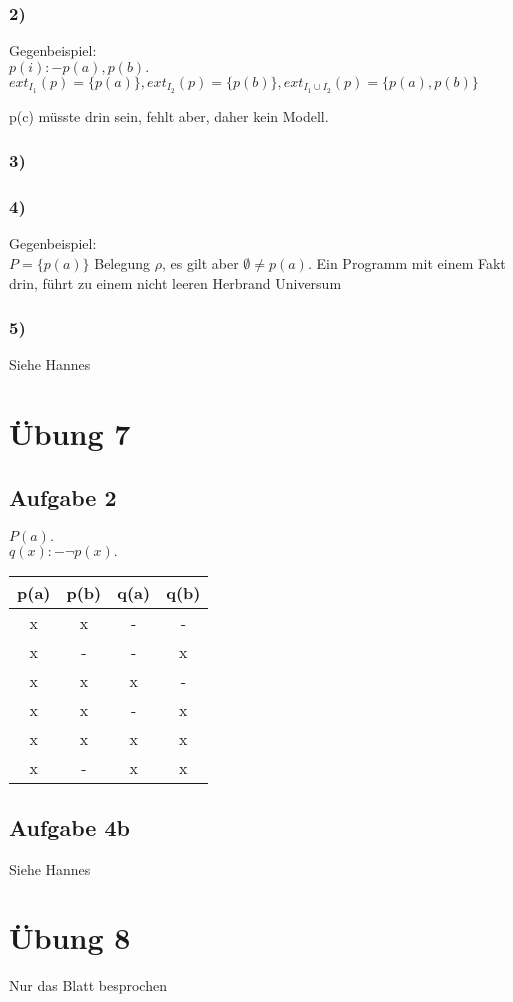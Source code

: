 \documentclass[12pt, a4paper]{article}
\begin{document}
\subsubsection*{2)}
Gegenbeispiel: \\
$p(i) :- p(a), p(b).$ \\
$ext_{I_1}(p) = \{ p(a)\}, ext_{I_2}(p) = \{ p(b) \}, ext_{I_1 \cup I_2}(p) = \{ p(a), p(b) \}$

p(c) müsste drin sein, fehlt aber, daher kein Modell.

\subsubsection*{3)}
\checkmark

\subsubsection*{4)}
Gegenbeispiel: \\
$P = \{ p(a) \}$ Belegung $\rho$, es gilt aber $\emptyset \neq p(a)$.
Ein Programm mit einem Fakt drin, führt zu einem nicht leeren Herbrand Universum

\subsubsection*{5)}
Siehe Hannes


\section*{Übung 7}

\subsection*{Aufgabe 2}
$P(a).$ \\
$q(x) :- \lnot p(x).$ \\
\begin{tabular}{|c|c|c|c|}
\hline
p(a) & p(b) & q(a) & q(b) \\ \hline
x & x & - & -\\
x & - & - & x\\
x & x & x & -\\
x & x & - & x\\
x & x & x & x\\
x & - & x & x\\
\hline
\end{tabular}

\subsection*{Aufgabe 4b}
Siehe Hannes



\section*{Übung 8}

Nur das Blatt besprochen
\end{document}
